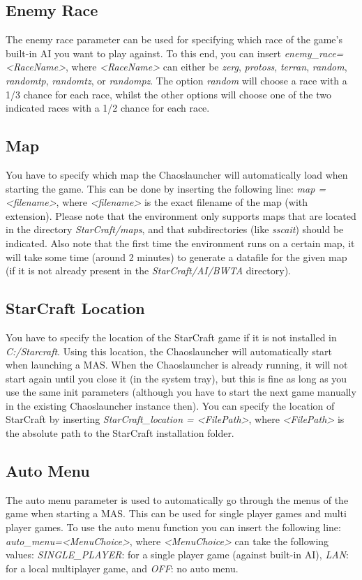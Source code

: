 \subsection{Enemy Race}
\label{enemy race}
The enemy race parameter can be used for specifying which race of the game's built-in AI you want to play against. To this end, you can insert \textit{enemy\_race=<RaceName>}, where \textit{<RaceName>} can either be \textit{zerg}, \textit{protoss}, \textit{terran}, \textit{random}, \textit{randomtp}, \textit{randomtz}, or \textit{randompz}. The option \textit{random} will choose a race with a 1/3 chance for each race, whilst the other options will choose one of the two indicated races with a 1/2 chance for each race.

\subsection{Map}
\label{map}
You have to specify which map the Chaoslauncher will automatically load when starting the game. This can be done by inserting the following line: \textit{map = <filename>}, where \textit{<filename>} is the exact filename of the map (with extension). Please note that the environment only supports maps that are located in the directory \textit{StarCraft/maps}, and that subdirectories (like \textit{sscait}) should be indicated. Also note that the first time the environment runs on a certain map, it will take some time (around 2 minutes) to generate a datafile for the given map (if it is not already present in the \textit{StarCraft/AI/BWTA} directory).

\pagebreak
\subsection{StarCraft Location}
\label{StarCraft location}
You have to specify the location of the StarCraft game if it is not installed in \textit{C:/Starcraft}. Using this location, the Chaoslauncher will automatically start when launching a MAS. When the Chaoslauncher is already running, it will not start again until you close it (in the system tray), but this is fine as long as you use the same init parameters (although you have to start the next game manually in the existing Chaoslauncher instance then). You can specify the location of StarCraft by inserting \textit{StarCraft\_location = <FilePath>}, where \textit{<FilePath>} is the absolute path to the StarCraft installation folder.

\subsection{Auto Menu}
\label{auto menu}
The auto menu parameter is used to automatically go through the menus of the game when starting a MAS. This can be used for single player games and multi player games. To use the auto menu function you can insert the following line: \textit{auto\_menu=<MenuChoice>}, where \textit{<MenuChoice>} can take the following values: \textit{SINGLE\_PLAYER}: for a single player game (against built-in AI), \textit{LAN}: for a local multiplayer game, and \textit{OFF}: no auto menu.

